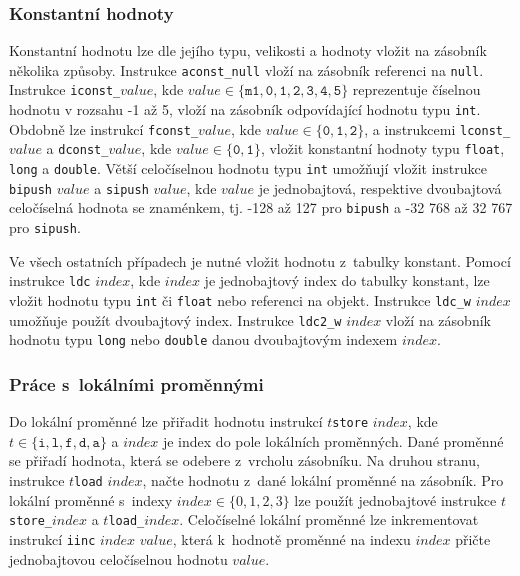 \subsubsection{Konstantní hodnoty}

Konstantní hodnotu lze dle jejího typu, velikosti a hodnoty vložit na zásobník několika způsoby.
Instrukce \texttt{aconst\_null} vloží na zásobník referenci na \texttt{null}. 
Instrukce \texttt{iconst\_}$value$, kde $value \in \{ \texttt{m1}, \texttt{0}, \texttt{1}, \texttt{2}, \texttt{3}, \texttt{4}, \texttt{5}\}$ reprezentuje číselnou hodnotu v rozsahu -1 až 5, vloží na zásobník odpovídající hodnotu typu \texttt{int}. Obdobně lze instrukcí \texttt{fconst\_}$value$, kde $value \in \{\texttt{0}, \texttt{1}, \texttt{2}\}$, a instrukcemi \texttt{lconst\_}$value$ a \texttt{dconst\_}$value$, kde $value \in \{\texttt{0}, \texttt{1}\}$, vložit konstantní hodnoty typu \texttt{float}, \texttt{long} a \texttt{double}. 
Větší celočíselnou hodnotu typu \texttt{int} umožňují vložit instrukce \texttt{bipush} $value$ a \texttt{sipush} $value$, kde $value$ je jednobajtová, respektive dvoubajtová celočíselná hodnota se znaménkem, tj. -128 až 127 pro \texttt{bipush} a -32 768 až 32 767 pro \texttt{sipush}.

Ve všech ostatních případech je nutné vložit hodnotu z~tabulky konstant. Pomocí instrukce \texttt{ldc} $index$, kde $index$ je jednobajtový index do tabulky konstant, lze vložit hodnotu typu \texttt{int} či \texttt{float} nebo referenci na objekt. Instrukce \texttt{ldc\_w} $index$ umožňuje použít dvoubajtový index. Instrukce \texttt{ldc2\_w} $index$ vloží na zásobník hodnotu typu \texttt{long} nebo \texttt{double} danou dvoubajtovým indexem  $index$.

\subsubsection{Práce s~lokálními proměnnými}

Do lokální proměnné lze přiřadit hodnotu instrukcí $t$\texttt{store} $index$, kde $t \in \{ \texttt{i}, \texttt{l}, \texttt{f}, \texttt{d}, \texttt{a} \}$ a $index$ je index do pole lokálních proměnných. Dané proměnné se přiřadí hodnota, která se odebere z~vrcholu zásobníku. Na druhou stranu, instrukce $t$\texttt{load} $index$, načte hodnotu z~dané lokální proměnné na zásobník. Pro lokální proměnné s~indexy $index \in \{0,1,2,3\}$ lze použít jednobajtové instrukce $t$\texttt{store\_}$index$ a $t$\texttt{load\_}$index$.
Celočíselné lokální proměnné lze inkrementovat instrukcí \texttt{iinc} $index$ $value$, která k~hodnotě proměnné na indexu $index$ přičte jednobajtovou celočíselnou hodnotu $value$.

